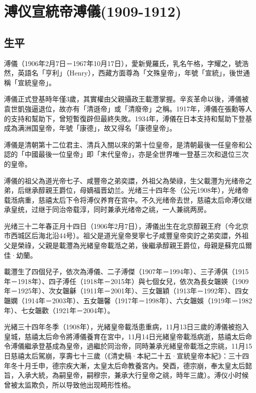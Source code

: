 
\section{溥仪宣統帝溥儀\tiny(1909-1912)}

\subsection{生平}

溥儀（1906年2月7日－1967年10月17日），愛新覺羅氏，乳名午格，字耀之，號浩然，英語名「亨利」（Henry），西藏方面尊為「文殊皇帝」，年號「宣統」，後世通稱「宣統皇帝」。

溥儀正式登基時年僅3歲，其實權由父親攝政王載灃掌握。辛亥革命以後，溥儀被袁世凱強逼退位，故亦有「清遜帝」或「清廢帝」之稱。1917年，溥儀在張勳等人的支持和幫助下，曾短暫復辟但最終失敗。1934年，溥儀在日本支持和幫助下登基成為满洲国皇帝，年號「康德」，故又得名「康德皇帝」。

溥儀是清朝第十二位君主、清兵入關以來的第十位皇帝，是清朝最後一任皇帝和公認的「中國最後一位皇帝」即「末代皇帝」，亦是全世界唯一登基三次和退位三次的皇帝。

溥儀的祖父為道光帝七子、咸豐帝之弟奕譞，外祖父為榮祿，生父載灃为光绪帝之弟，后继承醇親王爵位，母嫡福晋幼兰。光绪三十四年冬（公元1908年），光绪帝载湉病重，慈禧太后下令将溥仪养育在宫中。不久光绪帝去世，慈禧太后命溥仪继承皇统，过继于同治帝载淳，同时兼承光绪帝之祧，一人兼祧两房。

光绪三十二年春正月十四日（1906年2月7日），溥儀出生在北京醇親王府（今北京市西城区后海北沿44号）。祖父是道光皇帝旻寧七子咸豐皇帝奕詝之弟奕譞，外祖父是榮祿，父親是載灃為光緒皇帝載湉之弟，後繼承醇親王爵位，母親是蘇完瓜爾佳·幼蘭。

載灃生了四個兒子，依次為溥儀、二子溥傑（1907年－1994年）、三子溥倛（1915年－1918年）、四子溥任（1918年－2015年）與七個女兒，依次為長女韞媖（1909年－1925年）、次女韞龢（1911年－2001年）、三女韞穎（1913年－1992年）、四女韞嫻（1914年－2003年）、五女韞馨（1917年－1998年）、六女韞娛（1919年－1982年）、七女韞歡（1921年－2004年）。

光緒三十四年冬季（1908年），光緒皇帝載湉患重病，11月13日三歲的溥儀被抱入皇城，慈禧太后命令將溥儀養育在宮中，11月14日光緒皇帝載湉病逝，慈禧太后命令溥儀繼承登基成為皇帝，過繼於同治帝，同時兼承光緒皇帝載湉之宗祧，11月15日慈禧太后駕崩，享壽七十三歲（《清史稿·本紀二十五·宣統皇帝本紀》：三十四年冬十月壬申，德宗疾大漸，太皇太后命教養宮內。癸酉，德宗崩，奉太皇太后懿旨，入承大統，為嗣皇帝，嗣穆宗，兼承大行皇帝之祧，時年三歲）。溥仪小时候曾被太监欺负，所以导致他出现畸形性格。

